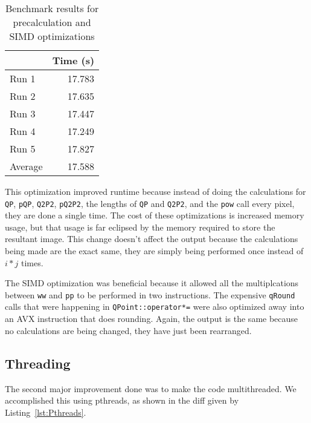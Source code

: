 \documentclass[12pt]{article}
\begin{document}

\begin{table}[H]
  \centering
  \begin{tabular}{lr}
    & {\bf Time (s)} \\
    \hline
    Run 1 & 17.783 \\
    Run 2 & 17.635 \\
    Run 3 & 17.447 \\
    Run 4 & 17.249 \\
    Run 5 & 17.827 \\
    \hline
    Average & 17.588 \\
  \end{tabular}
  \caption{Benchmark results for precalculation and SIMD optimizations}
  \label{tbl-precalculation}
\end{table}

This optimization improved runtime because instead of doing the
calculations for \texttt{QP}, \texttt{pQP}, \texttt{Q2P2},
\texttt{pQ2P2}, the lengths of \texttt{QP} and \texttt{Q2P2}, and the
\texttt{pow} call every pixel, they are done a single time. The cost
of these optimizations is increased memory usage, but that usage is
far eclipsed by the memory required to store the resultant image. This
change doesn't affect the output because the calculations being made
are the exact same, they are simply being performed once instead
of $i*j$ times.

The SIMD optimization was beneficial because it allowed all the
multiplcations between \texttt{ww} and \texttt{pp} to be performed in
two instructions. The expensive \texttt{qRound} calls that were
happening in \texttt{QPoint::operator*=} were also optimized away into
an AVX instruction that does rounding. Again, the output is the same
because no calculations are being changed, they have just been
rearranged.

\subsection*{Threading}

The second major improvement done was to make the code multithreaded. We accomplished this using pthreads, as shown in the diff given by Listing~\ref{lst:Pthreads}.
\end{document}
